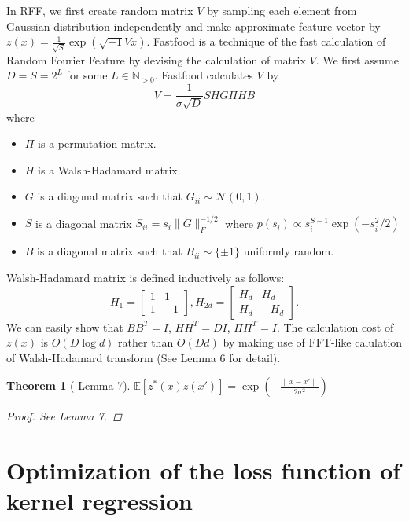 \documentclass{amsart}
\newtheorem{theorem}{Theorem}[section]
\theoremstyle{definition}
\theoremstyle{remark}
\numberwithin{equation}{section}
\begin{document}
In RFF, we first create random matrix $V$ by sampling each element from Gaussian distribution independently and make approximate feature vector by $z(x) = \frac{1}{\sqrt{S}} \exp (\sqrt{-1}Vx)$.
Fastfood \cite{le2013fastfood} is a technique of the fast calculation of Random Fourier Feature by devising the calculation of matrix $V$.
We first assume $D = S = 2^L$ for some $L\in \mathbb{N}_{>0}$.
Fastfood calculates $V$ by
\begin{equation}
V = \frac{1}{\sigma \sqrt{D}} SHG\Pi HB
\end{equation}
where
\begin{itemize}
\item $\Pi$ is a permutation matrix.
\item $H$ is a Walsh-Hadamard matrix.
\item $G$ is a diagonal matrix such that $G_{ii} \sim \mathcal{N}(0, 1)$.
\item $S$ is a diagonal matrix $S_{ii} = s_i \|G\|_{F}^{-1/2}$ where $p(s_i) \propto s_{i}^{S-1} \exp(-s_i^2/2)$
\item $B$ is a diagonal matrix such that $B_{ii}\sim \{\pm 1\}$ uniformly random.
\end{itemize}
Walsh-Hadamard matrix is defined inductively as follows:
\begin{equation}
H_1 = 
\begin{bmatrix}
1 & 1\\
1 & -1
\end{bmatrix},
H_{2d} = 
\begin{bmatrix}
H_d & H_d\\
H_d & -H_d
\end{bmatrix}.
\end{equation}
We can easily show that $BB^T = I$, $HH^T=DI$, $\Pi \Pi^T = I$.
The calculation cost of $z(x)$ is $O(D\log d)$ rather than $O(Dd)$ by making use of FFT-like calulation of Walsh-Hadamard transform (See \cite{le2013fastfood} Lemma 6 for detail).

\begin{theorem}[\cite{le2013fastfood} Lemma 7]
$\mathbb{E}[z^{\ast}(x) z(x')] = \exp(-\frac{\|x-x'\|}{2\sigma^2})$
\begin{proof}
See \cite{le2013fastfood} Lemma 7.
\end{proof}
\end{theorem}


\section{Optimization of the loss function of kernel regression}
\end{document}
